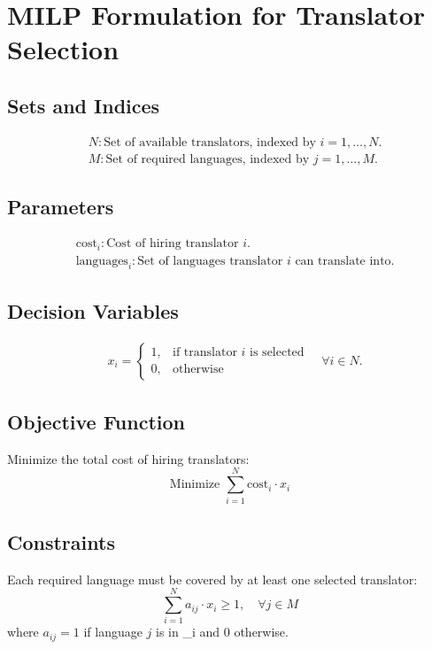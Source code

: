 \documentclass{article}
\begin{document}
\section*{MILP Formulation for Translator Selection}

\subsection*{Sets and Indices}
\begin{align*}
    & N: \text{Set of available translators, indexed by } i = 1, \ldots, N. \\
    & M: \text{Set of required languages, indexed by } j = 1, \ldots, M.
\end{align*}

\subsection*{Parameters}
\begin{align*}
    & \text{cost}_i: \text{Cost of hiring translator } i. \\
    & \text{languages}_i: \text{Set of languages translator } i \text{ can translate into}.
\end{align*}

\subsection*{Decision Variables}
\begin{align*}
    & x_i = \begin{cases} 
    1, & \text{if translator } i \text{ is selected} \\
    0, & \text{otherwise}
    \end{cases} \quad \forall i \in N.
\end{align*}

\subsection*{Objective Function}
Minimize the total cost of hiring translators:
\[
\text{Minimize } \sum_{i=1}^{N} \text{cost}_i \cdot x_i
\]

\subsection*{Constraints}
Each required language must be covered by at least one selected translator:
\[
\sum_{i=1}^{N} a_{ij} \cdot x_i \geq 1, \quad \forall j \in M
\]
where \( a_{ij} = 1 \) if language \( j \) is in _i and 0 otherwise.
\end{document}
